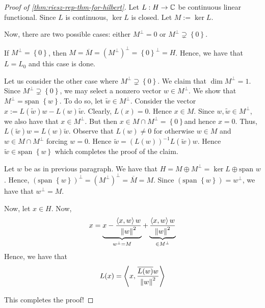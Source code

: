 \begin{proof}[Proof of \ref{thm:riesz-rep-thm-for-hilbert}]
    Let $L : H \to \mathbb C$ be continuous linear functional. Since $L$ is continuous, $\ker L$ is closed. Let $M:= \ker L$.

    Now, there are two possible cases: either $M^{\perp} = 0$ or $M^{\perp} \supsetneq \left\{ 0 \right\}$.

    If $M^{\perp} = \left\{ 0 \right\}$, then $M= \overline {M} = (M^{\perp})^{\perp} = \left\{ 0 \right\} ^{\perp} = H$. Hence, we have that $L = L_{0}$ and this case is done.

    Let us consider the other case where $M^{\perp} \supsetneq \left\{ 0 \right\}$. We claim that $\dim M^{\perp} = 1$. Since $M^{\perp} \supsetneq \left\{ 0 \right\}$, we may select a nonzero vector $w \in M^{\perp}$. We show that $M^{\perp} = \text{span } \left\{ w \right\}$. To do so, let $\tilde {w} \in M^{\perp}$. Consider the vector $x:= L\left( \tilde {w} \right) w - L(w) \tilde {w}$. Clearly, $L(x) = 0$. Hence $x \in M$. Since $w, \tilde{w} \in M^{\perp}$, we also have that $x \in M^{\perp}$. But then $x \in M \cap M^{\perp} = \left\{ 0 \right\}$and hence $x=0$. Thus, $L \left( \tilde w \right) w = L(w) \tilde w$. Observe that $L(w) \ne 0$ for otherwise $w \in M$ and $w \in M\cap M^{\perp}$ forcing $w = 0$. Hence $\tilde w = \left( L\left( w \right) \right)^{-1} L (\tilde w ) w$. Hence $\tilde w \in \text{span } \left\{ w \right\}$ which completes the proof of the claim.

    Let $w$ be as in previous paragraph. We have that $H = M \oplus M^{\perp} = \ker L \oplus \text{span } w$. Hence, $\left( \text{span } \left\{ w \right\} \right) ^{\perp} = (M^{\perp})^{\perp} = \overline {M} = M$. Since $\left( \text{span } \left\{ w \right\} \right) = w^{\perp}$, we have that $w^{\perp} = M$.

    Now, let $x\in H$. Now,
    \begin{equation*}
	x=\underbrace{x-\frac{\left\langle x,w \right\rangle w}{\left\lVert w \right\rVert^{2}}}_{w^{\perp}=M} + \underbrace{\frac{\left\langle x,w \right\rangle w}{\left\lVert w \right\rVert^{2}}}_{\in M^{\perp}}
    \end{equation*}
    Hence, we have that
    \begin{equation*}
	L(x)=\left\langle x, \frac{\overline {L(w)}w}{\left\lVert w \right\rVert ^{2}} \right\rangle
    \end{equation*}

    This completes the proof!
   \end{proof}

